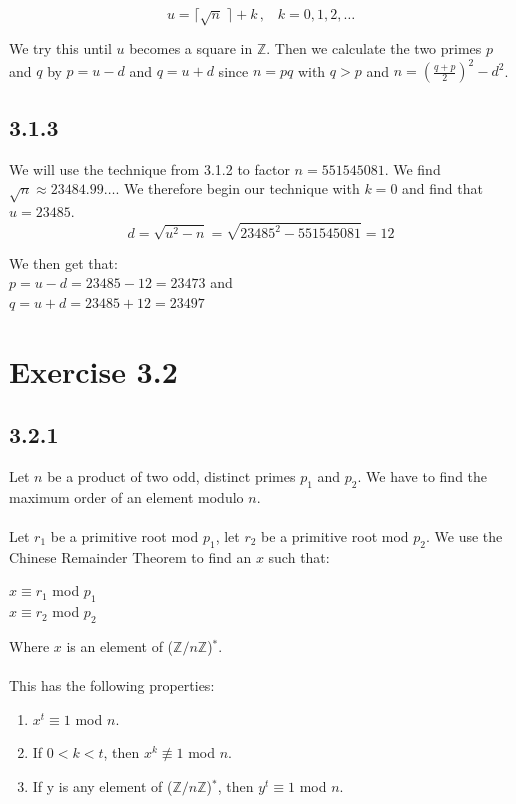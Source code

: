 \documentclass[11pt]{report}
\begin{document}
$$u = \lceil \sqrt{n} \; \rceil + k\,,\;\;\;k =0,1,2,\dots$$

We try this until $u$ becomes a square in $\mathbb{Z}$. Then we calculate the two primes $p$ and $q$ by $p = u - d$ and $q = u + d$ since $n = pq$ with $q > p$ and $n = (\frac{q + p}{2})^2 - d^2$.


\subsection*{3.1.3}
We will use the technique from 3.1.2 to factor $n = 551545081$. We find $\sqrt{n} \approx 23484.99\dots$. We therefore begin our technique with $k = 0$ and find that $u = 23485$.
$$d = \sqrt{u^2 - n} = \sqrt{23485^2 - 551545081} = 12$$

We then get that:\\
$p = u - d = 23485 - 12 = 23473$ and\\
$q = u + d = 23485 + 12 = 23497$\\

\section*{Exercise 3.2}
\subsection*{3.2.1}
Let $n$ be a product of two odd, distinct primes $p_1$ and $p_2$. We have to find the maximum order of an element modulo $n$.\\
\\
Let $r_1$ be a primitive root mod $p_1$, let $r_2$ be a primitive root mod $p_2$. We use the Chinese Remainder Theorem to find an $x$ such that:
\begin{center}
$x \equiv r_1$ mod $p_1$\\
$x \equiv r_2$ mod $p_2$
\end{center}
Where $x$ is an element of ($\mathbb{Z} / n\mathbb{Z}$)$^*$.\\
\\
This has the following properties:
\begin{enumerate}
\item $x^t \equiv 1$ mod $n$.
\item If $0 < k < t$, then $x^k \not\equiv 1$ mod $n$.
\item If y is any element of ($\mathbb{Z} / n\mathbb{Z}$)$^*$, then $y^t \equiv 1$ mod $n$.
\end{enumerate}
\end{document}
